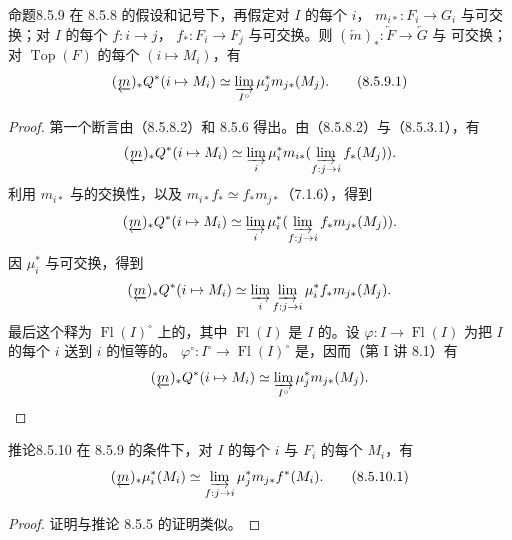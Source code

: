 \begin{SGAresult}{命题}{8.5.9}
在 8.5.8 的假设和记号下，再假定对 $I$ 的每个 $i$， $m_{i*}:F_i\to G_i$ 与可交换；对 $I$ 的每个 $f:i\to j$， $f_*:F_i\to F_j$ 与可交换。则 $(\underleftarrow m)_*:\underleftarrow F\to\underleftarrow G$ 与
可交换；对 $\operatorname{Top}(F)$ 的每个 $(i\mapsto M_i)$，有
\[
 (\underleftarrow m)_*Q^*(i\mapsto M_i)\simeq
 \varinjlim_{I^\circ}\mu_j^*m_{j*}(M_j).\tag{8.5.9.1}
\]
\end{SGAresult}
\begin{proof}
第一个断言由（8.5.8.2）和 8.5.6 得出。由（8.5.8.2）与（8.5.3.1），有
\[
 (\underleftarrow m)_*Q^*(i\mapsto M_i)\simeq
 \varinjlim_i\mu_i^*m_{i*}(\varinjlim_{f:j\to i}f_*(M_j)).
\]
利用 $m_{i*}$ 与的交换性，以及 $m_{i*}f_*\simeq f_*m_{j*}$（7.1.6），得到
\[
 (\underleftarrow m)_*Q^*(i\mapsto M_i)\simeq
 \varinjlim_i\mu_i^*(\varinjlim_{f:j\to i}f_*m_{j*}(M_j)).
\]
因 $\mu_i^*$ 与可交换，得到
\[
 (\underleftarrow m)_*Q^*(i\mapsto M_i)\simeq
 \varinjlim_i\varinjlim_{f:j\to i}\mu_i^*f_*m_{j*}(M_j).
\]
最后这个释为 $\operatorname{Fl}(I)^\circ$ 上的，其中 $\operatorname{Fl}(I)$ 是 $I$ 的。设 $\varphi:I\to\operatorname{Fl}(I)$ 为把 $I$ 的每个 $i$ 送到 $i$ 的恒等的。 $\varphi^\circ:I^\circ\to\operatorname{Fl}(I)^\circ$ 是，因而（第 I 讲 8.1）有
\[
 (\underleftarrow m)_*Q^*(i\mapsto M_i)\simeq
 \varinjlim_{I^\circ}\mu_j^*m_{j*}(M_j).
\]
\end{proof}

\begin{SGAresult}{推论}{8.5.10}
在 8.5.9 的条件下，对 $I$ 的每个 $i$ 与 $F_i$ 的每个 $M_i$，有
\[
 (\underleftarrow m)_*\mu_i^*(M_i)\simeq
 \varinjlim_{f:j\to i}\mu_j^*m_{j*}f^*(M_i).\tag{8.5.10.1}
\]
\end{SGAresult}
\begin{proof}
证明与推论 8.5.5 的证明类似。
\end{proof}

